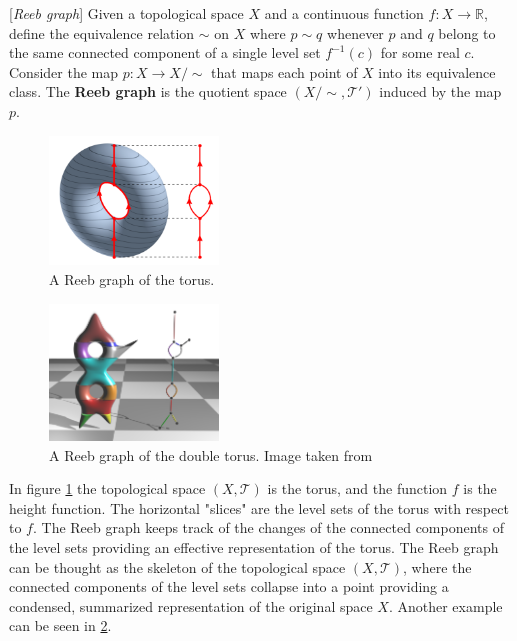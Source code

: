 \begin{definition}{[\textit{Reeb graph}]}
	Given a topological space $X$ and a continuous function $f: X \rightarrow \mathbb{R}$, define the equivalence relation $\sim$ on $X$ where $p \sim q$ whenever $p$ and $q$ belong to the same connected component of a single level set $f^{-1}(c)$  for some real $c$. Consider the map $p: X \rightarrow X/\sim$ that maps each point of $X$ into its equivalence class. The \textbf{Reeb graph} is the quotient space $(X/\sim,\mathcal{T}')$ induced by the map $p$.
\end{definition}
\begin{figure}[htbp!] 
	\centering    
	\includegraphics[width=0.4\textwidth]{3D-Leveltorus-Reebgraph.png}
	\caption{A Reeb graph of the torus.}
	\label{fig:reebgraph}
\end{figure}
\begin{figure}[htbp!] 
	\centering    
	\includegraphics[width=0.4\textwidth]{reebgraph.png}
	\caption{A Reeb graph of the double torus. Image taken from \cite{reebgraphs}}
	\label{fig:reebgraph2}
\end{figure}

In figure \ref{fig:reebgraph} the topological space $(X,\mathcal{T})$ is the torus, and the function $f$ is the height function. The horizontal "slices" are the level sets of the torus with respect to $f$. The Reeb graph keeps track of the changes of the connected components of the level sets providing an effective representation of the torus. The Reeb graph can be thought as the skeleton of the topological space $(X,\mathcal{T})$, where the connected components of the level sets collapse into a point providing a condensed, summarized representation of the original space $X$. Another example can be seen in \ref{fig:reebgraph2}.

